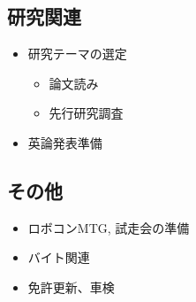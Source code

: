 \documentclass[uplatex, onecolumn, 10pt]{jsarticle}
\begin{document}
\subsection*{研究関連}
\begin{itemize}
    \item 研究テーマの選定
    \begin{itemize}
        \item 論文読み
        \item 先行研究調査
    \end{itemize}
    \item 英論発表準備
\end{itemize}

\subsection*{その他}
\begin{itemize}
    \item ロボコンMTG, 試走会の準備
    \item バイト関連
    \item 免許更新、車検
\end{itemize}
\end{document}
